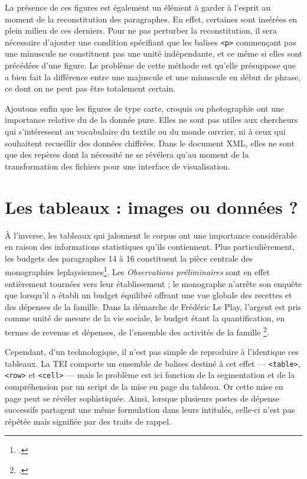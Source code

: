 La présence de ces figures est également un élément à garder à l'esprit au moment de la reconstitution des paragraphes. En effet, certaines sont insérées en plein milieu de ces derniers. Pour ne pas perturber la reconstitution, il sera nécessaire d'ajouter une condition spécifiant que les balises \texttt{<p>} commençant pas une minuscule ne constituent pas une unité indépendante, et ce même si elles sont précédées d'une figure. Le problème de cette méthode est qu'elle présuppose que \lse{} a bien fait la différence entre une majuscule et une minuscule en début de phrase, ce dont on ne peut pas être totalement certain.

Ajoutons enfin que les figures de type carte, croquis ou photographie ont une importance relative du \pov{} de la donnée pure. Elles ne sont pas utiles aux chercheurs qui s'intéressent au vocabulaire du textile ou du monde ouvrier, ni à ceux qui souhaitent recueillir des données chiffrées. Dans le document XML, elles ne sont que des repères dont la nécessité ne se révélera qu'au moment de la transformation des fichiers pour une interface de visualisation.

\section{Les tableaux : images ou données ?}

À l'inverse, les tableaux qui jalonnent le corpus ont une importance considérable en raison des informations statistiques qu'ils contiennent. Plus particulièrement, les budgets des paragraphes 14 à 16 constituent \og la pièce centrale \fg{} des monographies leplaysiennes\footcite[p. 317]{savoyecontinuateurs}. Les \textit{Observations préliminaires} sont en effet entièrement tournées vers leur établissement ; le monographe n'arrête son enquête que lorsqu'il a établi un budget équilibré offrant une vue globale des recettes et des dépenses de la famille. Dans la démarche de Frédéric Le Play, \og l'argent est pris comme unité de mesure de la vie sociale, le budget étant la quantification, en termes de revenus et dépenses, de l'ensemble des activités de la famille \fg\footcite[p. 317]{savoyecontinuateurs}.

Cependant, d'un \pov{} technologique, il n'est pas simple de reproduire à l'identique ces tableaux. La TEI comporte un ensemble de balises destiné à cet effet --- \texttt{<table>}, \texttt{<row>} et \texttt{<cell>} --- mais le problème est ici fonction de la segmentation et de la compréhension par un script de la mise en page du tableau. Or cette mise en page peut se révéler sophistiquée. Ainsi, lorsque plusieurs postes de dépense successifs partagent une même formulation dans leurs intitulés, celle-ci n'est pas répétée mais signifiée par des traits de rappel.

